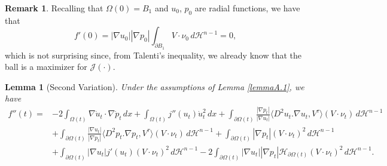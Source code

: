 \documentclass[oneside,a4paper,11pt,notitlepage]{article}
\newcommand{\abs}[1]{{\left|#1\right|}}
\theoremstyle{definition}
\theoremstyle{plain}
\newtheorem{lemma}[theorem]{Lemma}
\theoremstyle{definition}
\newtheorem{oss}[esempio]{Remark}
\begin{document}
 \begin{oss}
     Recalling that $\Omega(0)=B_1$ and $u_0$, $p_0$ are radial functions, we have that
    \begin{equation*}
        f'(0)=\abs{\nabla u_0}\abs{\nabla p_0}\int_{\partial B_1}V\cdot \nu_0\,d\mathcal{H}^{n-1}=0,
    \end{equation*}
    which is not surprising since, from Talenti's inequality, we already know that the ball is a maximizer for $\mathcal{J}(\cdot)$.
 \end{oss}

\begin{lemma}[Second Variation]
    Under the assumptions of Lemma \ref{lemmaA.1}, we have
    \begin{equation}\label{dersec(3)}
    \begin{split}
        f''(t)=&-2\int_{\Omega(t)}\nabla \dot{u}_t\cdot\nabla\dot{p}_t \,dx+\int_{\Omega(t)}j''(u_t)\dot{u}_t^2\,dx+\int_{\partial\Omega(t)}\frac{\abs{\nabla p_t}}{\abs{\nabla u_t}}\langle D^2u_t.\nabla u_t,V^\tau\rangle(V\cdot\nu_t)\,d\mathcal{H}^{n-1}\\
        &+\int_{\partial\Omega(t)}\frac{\abs{\nabla u_t}}{\abs{\nabla p_t}}\langle D^2p_t.\nabla p_t,V^\tau\rangle(V\cdot\nu_t)\,d\mathcal{H}^{n-1}+\int_{\partial\Omega(t)}\abs{\nabla p_t}(V\cdot\nu_t)^2\,d\mathcal{H}^{n-1}\\
        &+\int_{\partial\Omega(t)}\abs{\nabla u_t}j'(u_t)(V\cdot\nu_t)^2\,d\mathcal{H}^{n-1}-2\int_{\partial\Omega(t)}\abs{\nabla u_t}\abs{\nabla p_t}\mathscr{H}_{\partial\Omega(t)}(V\cdot\nu_t)^2\,d\mathcal{H}^{n-1}.
    \end{split}
\end{equation}
\end{lemma}
\end{document}
